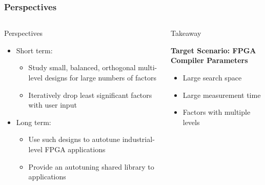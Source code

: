 \documentclass[10pt, compress, aspectratio=169, xcolor={table,usenames,dvipsnames}]{beamer}
\begin{document}
\begin{frame}
    \frametitle{Perspectives}
    \begin{columns}[c]
            \begin{block}{Perspectives}
                \begin{itemize}
                    \item \alert{Short term}:
                        \begin{itemize}
                            \item Study \alert{small}, \alert{balanced},
                                \alert{orthogonal} \alert{multi-level} designs
                                for \alert{large numbers of factors}
                            \item Iteratively \alert{drop least significant
                                factors} with \alert{user input}
                        \end{itemize}
                    \item \alert{Long term}:
                        \begin{itemize}
                            \item Use such designs to \alert{autotune
                                industrial-level FPGA applications}
                            \item Provide an \alert{autotuning shared library}
                                to applications
                        \end{itemize}
                \end{itemize}
            \end{block}

            \begin{block}{Takeaway}

                \vspace{.2cm}

                \textbf{Target Scenario: \alert{FPGA Compiler Parameters}}

                \vspace{-.1cm}

                \begin{itemize}
                    \item \alert{Large search space}
                    \item \alert{Large measurement time}
                    \item Factors with \alert{multiple levels}
                \end{itemize}


\end{block}
\end{columns}
\end{frame}
\end{document}
